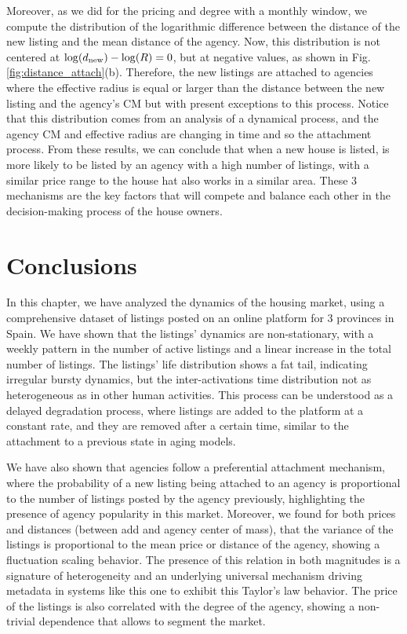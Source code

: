 Moreover, as we did for the pricing and degree with a monthly window, we compute the distribution of the logarithmic difference between the distance of the new listing and the mean distance of the agency. Now, this distribution is not centered at $\log(d_{\rm new}) - \log(R) = 0$, but at negative values, as shown in Fig. \ref{fig:distance_attach}(b). Therefore, the new listings are attached to agencies where the effective radius is equal or larger than the distance between the new listing and the agency's CM but with present exceptions to this process. Notice that this distribution comes from an analysis of a dynamical process, and the agency CM and effective radius are changing in time and so the attachment process. From these results, we can conclude that when a new house is listed, is more likely to be listed by an agency with a high number of listings, with a similar price range to the house hat also works in a similar area. These 3 mechanisms are the key factors that will compete and balance each other in the decision-making process of the house owners.

\section{Conclusions}

In this chapter, we have analyzed the dynamics of the housing market, using a comprehensive dataset of listings posted on an online platform for 3 provinces in Spain. We have shown that the listings' dynamics are non-stationary, with a weekly pattern in the number of active listings and a linear increase in the total number of listings. The listings' life distribution shows a fat tail, indicating irregular bursty dynamics, but the inter-activations time distribution not as heterogeneous as in other human activities. This process can be understood as a delayed degradation process, where listings are added to the platform at a constant rate, and they are removed after a certain time, similar to the attachment to a previous state in aging models. 

We have also shown that agencies follow a preferential attachment mechanism, where the probability of a new listing being attached to an agency is proportional to the number of listings posted by the agency previously, highlighting the presence of agency popularity in this market. Moreover, we found for both prices and distances (between add and agency center of mass), that the variance of the listings is proportional to the mean price or distance of the agency, showing a fluctuation scaling behavior. The presence of this relation in both magnitudes is a signature of heterogeneity and an underlying universal mechanism driving metadata in systems like this one to exhibit this Taylor's law behavior. The price of the listings is also correlated with the degree of the agency, showing a non-trivial dependence that allows to segment the market. 

